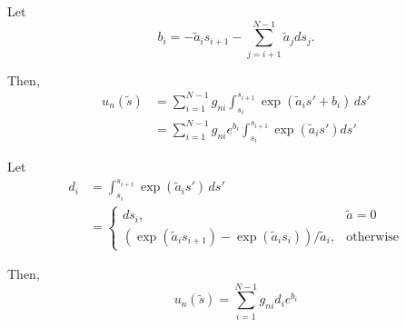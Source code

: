 Let
\begin{equation}
  b_i = -\tilde{a}_{i}s_{i+1} - \sum_{j=i+1}^{N-1}\tilde{a}_{j}ds_j.
\end{equation}

Then,
\begin{align}
  u_n(\tilde{s}) &= \sum_{i=1}^{N-1}g_{ni}\int_{s_i}^{s_{i+1}}  \exp\left(\tilde{a}_{i}s' + b_i\right)\, ds' \\
                 &= \sum_{i=1}^{N-1}g_{ni}e^{b_i}\int_{s_i}^{s_{i+1}}  \exp\left(\tilde{a}_{i}s'\right) ds'
\end{align}

Let
\begin{align}
  d_i &= \int_{s_i}^{s_{i+1}}  \exp\left(\tilde{a}_{i}s'\right)\, ds' \\
    &= \begin{cases}
    ds_i, & \tilde{a} = 0 \\
      \left( \exp(\tilde{a}_i s_{i+1}) - \exp(\tilde{a}_i s_i) \right)/\tilde{a}_i, & \mbox{otherwise}
    \end{cases}
\end{align}

Then,
\begin{equation}
  u_n(\tilde{s}) = \sum_{i=1}^{N-1} g_{ni}d_i e^{b_i}
\end{equation}
